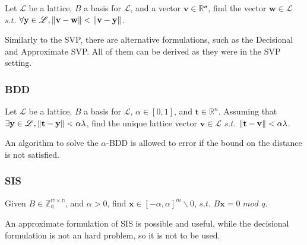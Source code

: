 \begin{definition}
Let $\mathscr{L}$ be a lattice, $B$ a basis for $\mathscr{L}$, and a vector $\mathbf{v}\in\mathscr{\mathbb{R}^n}$, find the vector $\mathbf{w}\in\mathscr{L}$ $s.t.$ $\forall\mathbf{y}\in\mathscr{L},\left\lVert \mathbf{v}-\mathbf{w} \right\rVert < \left\lVert \mathbf{v}-\mathbf{y} \right\rVert$.
\end{definition}

Similarly to the SVP, there are alternative formulations, such as the Decisional and Approximate SVP. All of them can be derived as they were in the SVP setting.

\subsubsection{BDD}

\begin{definition}
Let $\mathscr{L}$ be a lattice, $B$ a basis for $\mathscr{L}$, $\alpha\in[0,1]$, and $\mathbf{t}\in\mathbb{R}^n$. Assuming that $\exists \mathbf{y}\in\mathscr{L},\left\lVert \mathbf{t}-\mathbf{y} \right\rVert < \alpha\lambda$, find the unique lattice vector $\mathbf{v}\in\mathscr{L}$ $s.t.$ $\left\lVert \mathbf{t}-\mathbf{v} \right\rVert<\alpha\lambda$.
\end{definition}

\begin{remark}
An algorithm to solve the $\alpha$-BDD is allowed to error if the bound on the distance is not satisfied.
\end{remark}

\subsubsection{SIS}

\begin{definition}
Given $B\in\mathbb{Z_q^{m\times n}}$, and $\alpha > 0$, find $\mathbf{x}\in[-\alpha,\alpha]^m\backslash{0}$, $s.t.$ $B\mathbf{x}=0$ $mod$ $q$.
\end{definition}

\begin{remark}
An approximate formulation of SIS is possible and useful, while the decisional formulation is not an hard problem, so it is not to be used.
\end{remark}

